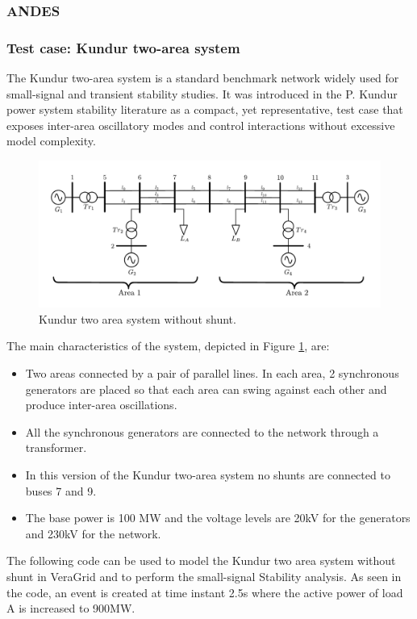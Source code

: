 \subsubsection{ANDES}

\subsubsection{Test case: Kundur two-area system}

The Kundur two-area system is a standard benchmark network widely used for small-signal and transient stability studies. It was introduced in the P. Kundur power system stability literature as a compact, yet representative, test case that exposes inter-area oscillatory modes and control interactions without excessive model complexity.

\begin{figure}[h!]
    \centering
    \includegraphics[width=1\linewidth]{figures/Kundur_system_no_shunt.pdf}
    \caption{Kundur two area system without shunt.}
    \label{fig:kundur_system}
\end{figure}

The main characteristics of the system, depicted in Figure \ref{fig:kundur_system}, are:
\begin{itemize}
    \item Two areas connected by a pair of parallel lines. In each area, 2 synchronous generators are placed so that each area can swing against each other and produce inter-area oscillations.
    \item All the synchronous generators are connected to the network through a transformer.
    \item In this version of the Kundur two-area system no shunts are connected to buses 7 and 9.
    \item The base power is 100 MW and the voltage levels are 20kV for the generators and 230kV for the network.
\end{itemize}

The following code can be used to model the Kundur two area system without shunt in VeraGrid and to perform the small-signal Stability analysis. As seen in the code, an event is created at time instant 2.5s where the active power of load A is increased to 900MW.